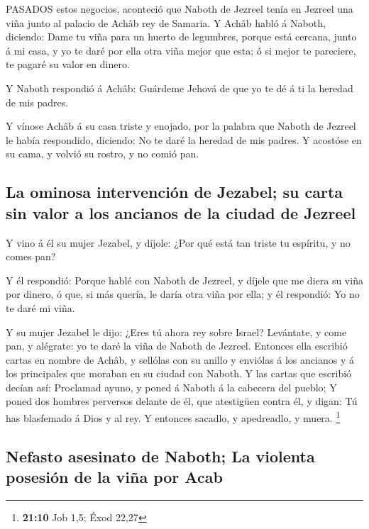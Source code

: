  PASADOS estos negocios, aconteció que Naboth de Jezreel
tenía en Jezreel una viña junto al palacio de Achâb rey de Samaria.
 Y Achâb habló á Naboth, diciendo: Dame tu viña para un
huerto de legumbres, porque está cercana, junto á mi casa, y yo te daré
por ella otra viña mejor que esta; ó si mejor te pareciere, te pagaré su
valor en dinero.

 Y Naboth respondió á Achâb: Guárdeme Jehová de que yo te dé
á ti la heredad de mis padres.

 Y vínose Achâb á su casa triste y enojado, por la palabra
que Naboth de Jezreel le había respondido, diciendo: No te daré la
heredad de mis padres. Y acostóse en su cama, y volvió su rostro, y no
comió pan.

\hypertarget{la-ominosa-intervenciuxf3n-de-jezabel-su-carta-sin-valor-a-los-ancianos-de-la-ciudad-de-jezreel}{%
\subsection{La ominosa intervención de Jezabel; su carta sin valor a los
ancianos de la ciudad de
Jezreel}\label{la-ominosa-intervenciuxf3n-de-jezabel-su-carta-sin-valor-a-los-ancianos-de-la-ciudad-de-jezreel}}

 Y vino á él su mujer Jezabel, y díjole: ¿Por qué está tan
triste tu espíritu, y no comes pan?

 Y él respondió: Porque hablé con Naboth de Jezreel, y
díjele que me diera su viña por dinero, ó que, si más quería, le daría
otra viña por ella; y él respondió: Yo no te daré mi viña.

 Y su mujer Jezabel le dijo: ¿Eres tú ahora rey sobre
Israel? Levántate, y come pan, y alégrate: yo te daré la viña de Naboth
de Jezreel.  Entonces ella escribió cartas en nombre de
Achâb, y sellólas con su anillo y enviólas á los ancianos y á los
principales que moraban en su ciudad con Naboth.  Y las
cartas que escribió decían así: Proclamad ayuno, y poned á Naboth á la
cabecera del pueblo;  Y poned dos hombres perversos delante
de él, que atestigüen contra él, y digan: Tú has blasfemado á Dios y al
rey. Y entonces sacadlo, y apedreadlo, y muera. \footnote{\textbf{21:10}
  Job 1,5; Éxod 22,27}

\hypertarget{nefasto-asesinato-de-naboth-la-violenta-posesiuxf3n-de-la-viuxf1a-por-acab}{%
\subsection{Nefasto asesinato de Naboth; La violenta posesión de la viña
por
Acab}\label{nefasto-asesinato-de-naboth-la-violenta-posesiuxf3n-de-la-viuxf1a-por-acab}}

